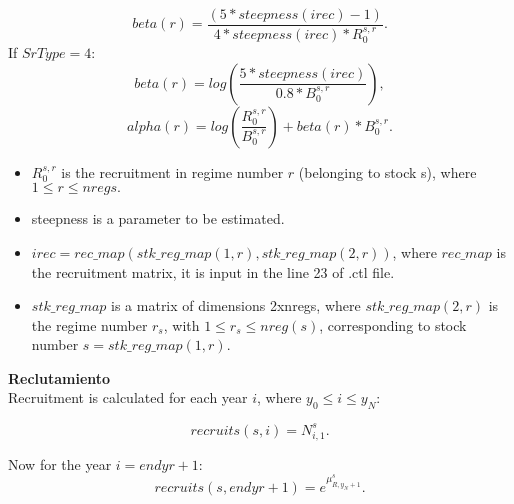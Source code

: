 \documentclass{article}
\begin{document}
\begin{equation}
    beta(r)=\dfrac{(5*steepness(irec)-1)}{4*steepness(irec)*R^{s,r}_0}.
\end{equation}
If $SrType=4$:
\begin{equation}
    beta(r)=log\left(\dfrac{5*steepness(irec)}{0.8*B^{s,r}_0}\right),
\end{equation}
\begin{equation}
    alpha(r)=log\left(\dfrac{R^{s,r}_0}{B^{s,r}_0}\right)+beta(r)*B^{s,r}_0.
\end{equation}
\begin{itemize}
    \item $R^{s,r}_0$ is the recruitment in regime number $r$ (belonging to stock s), where $1\leq r \leq nregs.$
    \item steepness is a parameter to be estimated.
    \item $irec=rec\_map(stk\_reg\_map(1,r),stk\_reg\_map(2,r))$, where $rec\_map$ is the recruitment matrix, it is input in the line 23 of .ctl file.
    \item $stk\_reg\_map$ is a matrix of dimensions 2xnregs, where $stk\_reg\_map(2,r)$ is the regime number $r_s$, with $1\leq r_s \leq nreg(s)$, corresponding to stock number $s=stk\_reg\_map(1,r)$.
\end{itemize}

\textbf{Reclutamiento}\\

Recruitment is calculated for each year $i$, where $y_0\leq i \leq y_N$:

\begin{equation}
    recruits(s,i)=N^s_{i,1}.
\end{equation}

Now for the year $i=endyr+1$:
\begin{equation}
    recruits(s,endyr+1)=e^{\mu^s_{R,y_N+1}}.
\end{equation}
\end{document}
